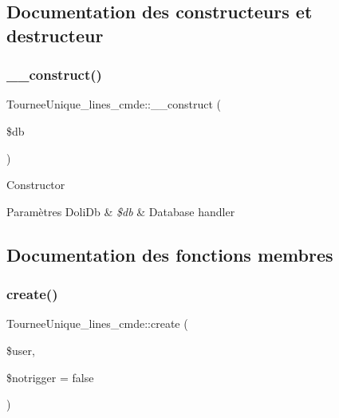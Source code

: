 \subsection{Documentation des constructeurs et destructeur}
\mbox{\label{classTourneeUnique__lines__cmde_aa371ccc9c9e140c39e1c3c64ad705696}} 
\subsubsection{\texorpdfstring{\+\_\+\+\_\+construct()}{\_\_construct()}}
{\footnotesize\ttfamily Tournee\+Unique\+\_\+lines\+\_\+cmde\+::\+\_\+\+\_\+construct (\begin{DoxyParamCaption}\item[{Doli\+DB}]{\$db }\end{DoxyParamCaption})}

Constructor


\begin{DoxyParams}[1]{Paramètres}
Doli\+Db & {\em \$db} & Database handler \\
\hline
\end{DoxyParams}


\subsection{Documentation des fonctions membres}
\mbox{\label{classTourneeUnique__lines__cmde_a1c9c3468a1f595203f05ac1dc8c230e5}} 
\subsubsection{\texorpdfstring{create()}{create()}}
{\footnotesize\ttfamily Tournee\+Unique\+\_\+lines\+\_\+cmde\+::create (\begin{DoxyParamCaption}\item[{User}]{\$user,  }\item[{}]{\$notrigger = {\ttfamily false} }\end{DoxyParamCaption})}

